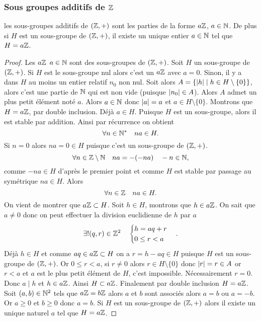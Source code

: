 \subsubsection{Sous groupes additifs de $\mathbb{Z}$}

\begin{theo}
  les sous-groupes additifs de $(\mathbb{Z},+)$ sont les parties de la forme $a\mathbb{Z}$, $a \in \mathbb{N}$. De plus si $H$ est un sous-groupe de $(\mathbb{Z},+)$, il existe un unique entier $a \in \mathbb{N}$ tel que $H=a\mathbb{Z}$.
\end{theo}
\begin{proof}
  Les $a\mathbb{Z}$ $a \in \mathbb{N}$ sont des sous-groupes de $(\mathbb{Z},+)$. Soit $H$ un sous-groupe de $(\mathbb{Z},+)$. Si $H$ est le sous-groupe nul alors c'est un $a\mathbb{Z}$ avec $a=0$. Sinon, il y a dans $H$ au moins un entier relatif $n_0$ non nul. Soit alors $A=\left\{\left\lvert h\right\rvert\mathrel{}\middle|\mathrel{}h \in H\setminus\{0\}\right\}$, alors c'est une partie de $\mathbb{N}$ qui est non vide (puisque $\left\lvert n_0\right\rvert \in A$). Alors $A$ admet un plus petit élément noté $a$. Alors $a \in \mathbb{N}$ donc $\left\lvert a\right\rvert=a$ et $a \in H\setminus\{0\}$. Montrons que $H=a\mathbb{Z}$, par double inclusion. Déjà $a \in H$. Puisque $H$ est un sous-groupe, alors il est stable par addition. Ainsi par récurrence on obtient
\begin{equation}
  \forall n \in \mathbb{N}^* \quad na \in H.
\end{equation}
Si $n=0$ alors $na=0 \in H$ puisque c'est un sous-groupe de $(\mathbb{Z},+)$. %
\begin{equation}
  \forall n \in \mathbb{Z}\setminus\mathbb{N} \quad na=-(-na) \quad -n \in \mathbb{N},
\end{equation}
comme $-na \in H$ d'après le premier point et comme $H$ est stable par passage au symétrique $na \in H$. Alors
\begin{equation}
  \forall n \in \mathbb{Z} \quad na \in H.
\end{equation}
On vient de montrer que $a\mathbb{Z} \subset H$. Soit $h \in H$, montrons que $h \in a\mathbb{Z}$. On sait que $a \neq 0$ donc on peut effectuer la division euclidienne de $h$ par $a$
\begin{equation}
  \exists! (q,r) \in \mathbb{Z}^2 \quad \begin{cases} h=aq+r \\ 0 \leq r < a \end{cases}.
\end{equation}
Déjà $h \in H$ et comme $aq \in a\mathbb{Z} \subset H$ on a $r=h-aq \in H$ puisque $H$ est un sous-groupe de $(\mathbb{Z},+)$. Or $0 \leq r < a$, si $r \neq 0$ alors $r \in H\setminus\{0\}$ donc $\left\lvert r\right\rvert=r \in A$ or $r < a$ et $a$ est le plus petit élément de $H$, c'est impossible. Nécessairement $r=0$. Donc $a\mid h$ et $h \in a\mathbb{Z}$. Ainsi $H \subset a\mathbb{Z}$. Finalement par double inclusion $H=a\mathbb{Z}$. Soit $(a,b) \in \mathbb{N}^2$ tels que $a\mathbb{Z}=b\mathbb{Z}$ alors $a$ et $b$ sont associés alors $a=b$ ou $a=-b$. Or $a \geq 0$ et $b \geq 0$ donc $a=b$. Si $H$ est un sous-groupe de $(\mathbb{Z},+)$ alors il existe un unique naturel $a$ tel que $H=a\mathbb{Z}$.
\end{proof}

